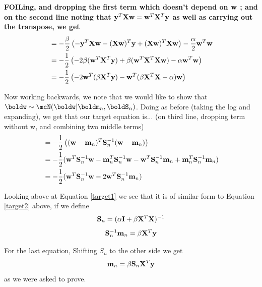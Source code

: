 \documentclass[submit]{harvardml}
\newenvironment{answer}{%
    \color{answergreen}\bf}
  {%
  }
\begin{document}
\begin{enumerate}
\begin{answer}
       FOILing, and dropping the first term which doesn't  depend on $\mathbf{w}$ ;
       and on the second line noting that $\mathbf{y}^T\mathbf{X}\mathbf{w} = \mathbf{w}^T\mathbf{X}^T\mathbf{y}$ as well
       as carrying out the transpose, we get
   \begin{align}
           &= - \frac{\beta}{2}     \left( - \mathbf{y}^T \mathbf{X}\mathbf{w} - (\mathbf{X}\mathbf{w})^T \mathbf{y} + (\mathbf{X}\mathbf{w})^T
           \mathbf{X}\mathbf{w} \right) 
           - \frac{\alpha}{2} \mathbf{w}^T\mathbf{w} \\
        &=- \frac{1}{2}\left(- 2 \beta(\mathbf{w}^T \mathbf{X}^T\mathbf{y}) + \beta(\mathbf{w}^T\mathbf{X}^T\mathbf{X}\mathbf{w}) - \alpha
        \mathbf{w}^T\mathbf{w} \right) \\
        &= - \frac{1}{2} \left( -2\mathbf{w}^T(\beta \mathbf{X}^T\mathbf{y})- \mathbf{w}^T(\beta \mathbf{X}^T\mathbf{X} -
        \alpha)\mathbf{w}
        \right) \label{target1}
    \end{align}

    Now working backwards, we note that we would like to show that
    $\boldw\sim\mcN(\boldw|\boldm_n,\boldS_n)$. Doing as before (taking the log
    and expanding), we get that our target equation is... (on third line,
    dropping term without w, and combining two middle terms) 
    \begin{align}
        &= - \frac{1}{2} \left( (\bw-\mathbf{m}_n)^T \bS_n^{-1} (\bw-\mathbf{m}_n) \right) \\
        &= - \frac{1}{2} ( \bw^T\bS_n^{-1}\bw - \mathbf{m}_n^T\bS_n^{-1}\bw -
        \bw^T\bS_n^{-1}\mathbf{m}_n 
        + \mathbf{m}_n^T\bS_n^{-1}\mathbf{m}_n ) \\
        &= -\frac{1}{2} (\bw^T\bS_n^{-1}\bw - 2\bw^T\bS_n^{-1}\mathbf{m}_n)  \\ %
        \label{target2} 
    \end{align}

    Looking above at Equation \ref{target1} we see that it is of similar form
    to Equation \eqref{target2} above, if we define 
    $$ \mathbf{S}_n = (\alpha\mathbf{I} + \beta \mathbf{X}^T \mathbf{X})^{-1} $$ 
    $$ \mathbf{S}_n^{-1}\mathbf{m}_n = \beta \mathbf{X}^T \mathbf{y}$$

    For the last equation, Shifting $S_n$ to the other side we get
    $$ \mathbf{m}_n = \beta \mathbf{S}_n \mathbf{X}^T \mathbf{y} $$
    as we were asked to prove.






\end{answer}
\end{enumerate}
\end{document}

